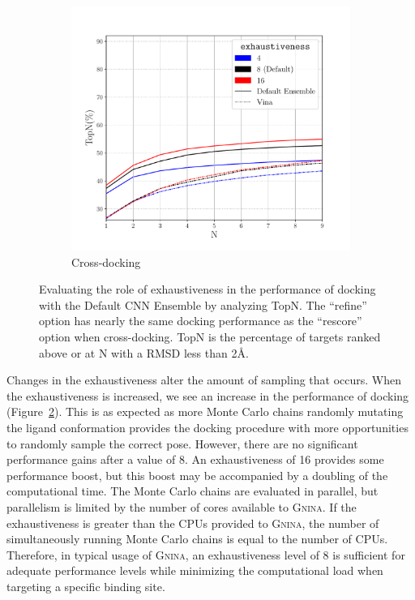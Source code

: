 \documentclass[journal=jcisd8,manuscript=article]{achemso}
\begin{document}
\begin{figure}
\begin{subfigure}[b]{0.48\textwidth}
		\includegraphics[width=\textwidth]{figures/crossdocking/sweep_exhaustiveness_line.pdf}
		\caption{Cross-docking}
		\label{fig:exhaustiveness cd}
        \end{subfigure}    
	\caption{Evaluating the role of exhaustiveness in the performance of docking with the Default CNN Ensemble by analyzing TopN. The ``refine'' option has nearly the same docking performance as the ``rescore'' option when cross-docking. TopN is the percentage of targets ranked above or at N with a RMSD less than 2{\AA}.}
	\label{fig:exhaustiveness}
\end{figure}    

Changes in the exhaustiveness alter the amount of sampling that occurs. When the exhaustiveness is increased, we see an increase in the performance of docking (Figure~\ref{fig:exhaustiveness}). This is as expected as more Monte Carlo chains randomly mutating the ligand conformation provides the docking procedure with more opportunities to randomly sample the correct pose. However, there are no significant performance gains after a value of 8. An exhaustiveness of 16 provides some performance boost, but this boost may be accompanied by a doubling of the computational time. The Monte Carlo chains are evaluated in parallel, but parallelism is limited by the number of cores available to \textsc{Gnina}. If the exhaustiveness is greater than the CPUs provided to \textsc{Gnina}, the number of simultaneously running Monte Carlo chains is equal to the number of CPUs. Therefore, in typical usage of \textsc{Gnina}, an exhaustiveness level of 8 is sufficient for adequate performance levels while minimizing the computational load when targeting a specific binding site. 
\end{document}
